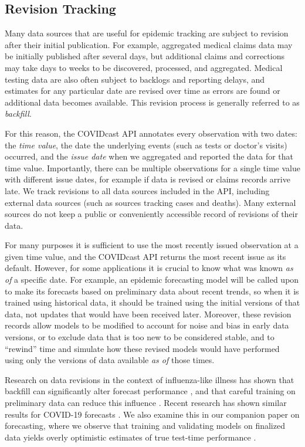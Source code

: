 \documentclass[11pt]{article}
\begin{document}
\subsection{Revision Tracking}
\label{subsec:revision_tracking}

Many data sources that are useful for epidemic tracking are subject to revision
after their initial publication. For example, aggregated medical claims data may
be initially published after several days, but additional claims and corrections
may take days to weeks to be discovered, processed, and aggregated. Medical
testing data are also often subject to backlogs and reporting delays, and
estimates for any particular date are revised over time as errors are found or
additional data becomes available. This revision process is generally referred
to as \textit{backfill}.

For this reason, the COVIDcast API annotates every observation with two dates:
the \textit{time value}, the date the underlying events (such as tests or
doctor's visits) occurred, and the \textit{issue date} when we aggregated and
reported the data for that time value. Importantly, there can be multiple
observations for a single time value with different issue dates, for example if
data is revised or claims records arrive late. We track revisions to all data
sources included in the API, including external data sources (such as sources
tracking cases and deaths). Many external sources do not keep a public or
conveniently accessible record of revisions of their data.

For many purposes it is sufficient to use the most recently issued observation
at a given time value, and the COVIDcast API returns the most recent issue as
its default. However, for some applications it is crucial to know what was known
\textit{as of} a specific date. For example, an epidemic forecasting model will
be called upon to make its forecasts based on preliminary data about recent
trends, so when it is trained using historical data, it should be trained using
the initial versions of that data, not updates that would have been received
later. Moreover, these revision records allow models to be modified to account
for noise and bias in early data versions, or to exclude data that is too new to
be considered stable, and to ``rewind'' time and simulate how these revised
models would have performed using only the versions of data available \textit{as
  of} those times.

Research on data revisions in the context of influenza-like illness has shown
that backfill can significantly alter forecast performance \cite{Brooks:2018,
  Reich:2019}, and that careful training on preliminary data can reduce this
influence \cite{Brooks:2020}. Recent research has shown similar results for
COVID-19 forecasts \cite{Kamarthi:2021}. We also examine this in our companion
paper on forecasting, where we observe that training and validating models on
finalized data yields overly optimistic estimates of true test-time
performance \cite{McDonald:2021}.
\end{document}
